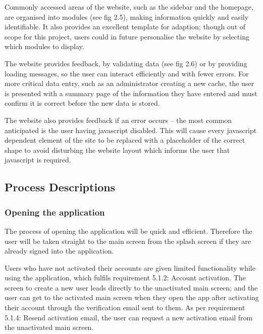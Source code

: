 Commonly accessed areas of the website, such as the sidebar and the homepage, are organised into modules (see fig 2.5), making information quickly and easily identifiable. It also provides an excellent template for adaption; though out of scope for this project, users could in future personalise the website by selecting which modules to display.

The website provides feedback, by validating data (see fig 2.6) or by providing loading messages, so the user can interact efficiently and with fewer errors. For more critical data entry, such as an administrator creating a new cache, the user is presented with a summary page of the information they have entered and must confirm it is correct before the new data is stored.

The website also provides feedback if an error occurs – the most common anticipated is the user having javascript disabled. This will cause every javascript dependent element of the site to be replaced with a placeholder of the correct shape to avoid disturbing the website layout which informs the user that javascript is required.
\vspace{80pt}
\subsection{Process Descriptions}

\subsubsection{Opening the application}

The process of opening the application will be quick and efficient. Therefore the user will be taken straight to the main screen from the splash screen if they are already signed into the application.

Users who have not activated their accounts are given limited functionality while using the application, which fulfils requirement 5.1.2: Account activation. The screen to create a new user leads directly to the unactivated main screen; and the user can get to the activated main screen when they open the app after activating their account through the verification email sent to them. As per requirement 5.1.4: Resend activation email, the user can request a new activation email from the unactivated main screen.

